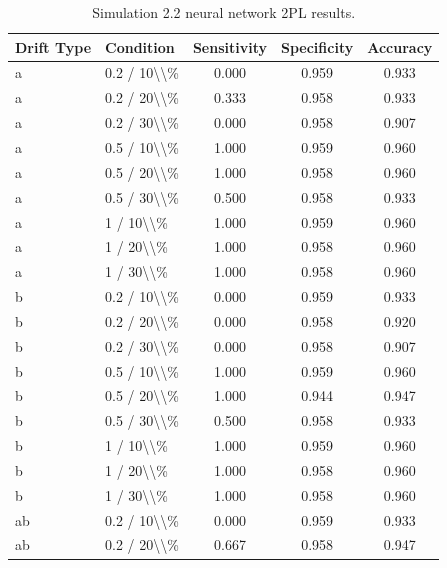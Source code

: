 \begin{table}[!h]
\centering
\caption{\label{tab:tab:sim22_nn_2pl}Simulation 2.2 neural network 2PL results.}
\centering
\begin{tabular}[t]{llccc}
\toprule
Drift Type & Condition & Sensitivity & Specificity & Accuracy\\
\midrule
a & 0.2 / 10\textbackslash{}\textbackslash{}\% & 0.000 & 0.959 & 0.933\\
a & 0.2 / 20\textbackslash{}\textbackslash{}\% & 0.333 & 0.958 & 0.933\\
a & 0.2 / 30\textbackslash{}\textbackslash{}\% & 0.000 & 0.958 & 0.907\\
a & 0.5 / 10\textbackslash{}\textbackslash{}\% & 1.000 & 0.959 & 0.960\\
a & 0.5 / 20\textbackslash{}\textbackslash{}\% & 1.000 & 0.958 & 0.960\\
\addlinespace
a & 0.5 / 30\textbackslash{}\textbackslash{}\% & 0.500 & 0.958 & 0.933\\
a & 1 / 10\textbackslash{}\textbackslash{}\% & 1.000 & 0.959 & 0.960\\
a & 1 / 20\textbackslash{}\textbackslash{}\% & 1.000 & 0.958 & 0.960\\
a & 1 / 30\textbackslash{}\textbackslash{}\% & 1.000 & 0.958 & 0.960\\
b & 0.2 / 10\textbackslash{}\textbackslash{}\% & 0.000 & 0.959 & 0.933\\
\addlinespace
b & 0.2 / 20\textbackslash{}\textbackslash{}\% & 0.000 & 0.958 & 0.920\\
b & 0.2 / 30\textbackslash{}\textbackslash{}\% & 0.000 & 0.958 & 0.907\\
b & 0.5 / 10\textbackslash{}\textbackslash{}\% & 1.000 & 0.959 & 0.960\\
b & 0.5 / 20\textbackslash{}\textbackslash{}\% & 1.000 & 0.944 & 0.947\\
b & 0.5 / 30\textbackslash{}\textbackslash{}\% & 0.500 & 0.958 & 0.933\\
\addlinespace
b & 1 / 10\textbackslash{}\textbackslash{}\% & 1.000 & 0.959 & 0.960\\
b & 1 / 20\textbackslash{}\textbackslash{}\% & 1.000 & 0.958 & 0.960\\
b & 1 / 30\textbackslash{}\textbackslash{}\% & 1.000 & 0.958 & 0.960\\
ab & 0.2 / 10\textbackslash{}\textbackslash{}\% & 0.000 & 0.959 & 0.933\\
ab & 0.2 / 20\textbackslash{}\textbackslash{}\% & 0.667 & 0.958 & 0.947\\

\end{tabular}
\end{table}
